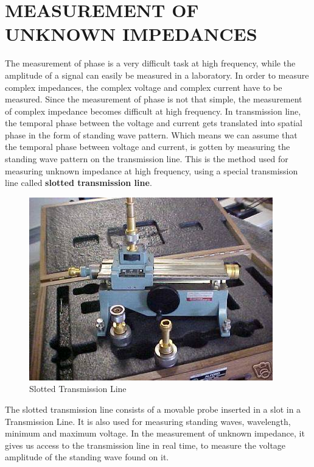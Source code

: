 \section{MEASUREMENT OF UNKNOWN IMPEDANCES}
The measurement of phase is a very difficult task at high frequency, while the amplitude of a signal can easily be measured
in a laboratory. In order to measure complex impedances, the complex voltage and complex current have to be measured. Since the measurement of phase is not that simple, the measurement of complex impedance becomes difficult at high frequency. In transmission line, the temporal phase between the voltage and current gets translated into spatial phase in the form of standing wave pattern.
Which means we can assume that the temporal phase between voltage and current, is gotten by measuring the standing wave pattern on the transmission line. This is the method used for measuring unknown impedance at high frequency, using a special transmission line called \textbf{slotted
transmission line}.
\begin{figure}[h]
\centering
\includegraphics[width=1\linewidth]{./graphics/slottedT}
\caption{Slotted Transmission Line}
\end{figure}

The slotted transmission line consists of a movable probe inserted in a slot in a Transmission Line. It is also used for measuring standing waves, wavelength, minimum and maximum voltage. In the measurement of unknown impedance, it gives us access to the transmission line in real time, to measure the voltage amplitude of the standing wave found on it.

